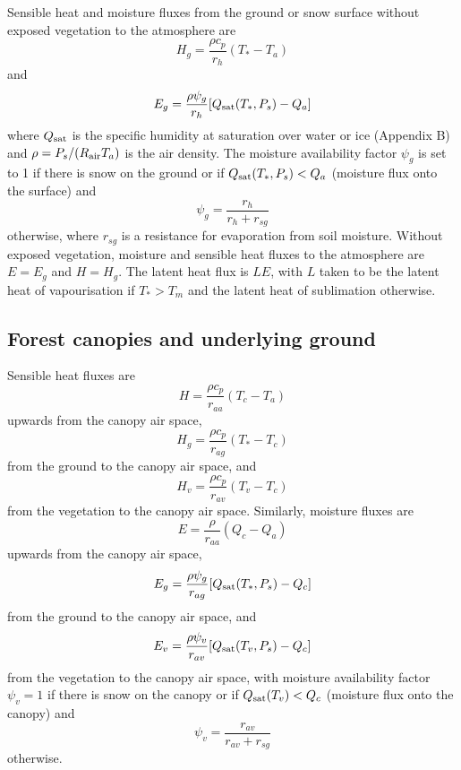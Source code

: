 \documentclass{article}
\begin{document}
Sensible heat and moisture fluxes from the ground or snow surface without exposed vegetation to the atmosphere are
\begin{equation}
H_g = \frac{\rho c_p}{r_h}(T_* - T_a)
\label{eq:Hg}
\end{equation}
and
\begin{equation}
E_g = \frac{\rho\psi_g}{r_h}[Q_{\rm sat}(T_*,P_s) - Q_a]
\label{eq:Eg}
\end{equation}
where $Q_{\rm sat}$ is the specific humidity at saturation over water or ice (Appendix B) and $\rho=P_s/(R_{\rm air}T_a)$ is the air density. The moisture availability factor $\psi_g$ is set to 1 if there is snow on the ground or if $Q_{\rm sat}(T_*,P_s)<Q_a$ (moisture flux onto the surface) and 
\begin{equation}
\psi_g = \frac{r_h}{r_h+r_{sg}}
\label{eq:psig}
\end{equation}
otherwise, where $r_{sg}$ is a resistance for evaporation from soil moisture. Without exposed vegetation, moisture and sensible heat fluxes to the atmosphere are $E=E_g$ and $H=H_g$. The latent heat flux is $LE$, with $L$ taken to be the latent heat of vapourisation if $T_*>T_m$ and the latent heat of sublimation otherwise.

\subsection{Forest canopies and underlying ground}

Sensible heat fluxes are 
\begin{equation}
H = \frac{\rho c_p}{r_{aa}}(T_c - T_a)
\label{eq:H}
\end{equation}
upwards from the canopy air space,
\begin{equation}
H_g = \frac{\rho c_p}{r_{ag}}(T_* - T_c)
\end{equation}
from the ground to the canopy air space, and
\begin{equation}
H_v = \frac{\rho c_p}{r_{av}}(T_v - T_c)
\label{eq:Hv}
\end{equation}
from the vegetation to the canopy air space. Similarly, moisture fluxes are  
\begin{equation}
E = \frac{\rho}{r_{aa}}(Q_c - Q_a)
\end{equation}
upwards from the canopy air space,
\begin{equation}
E_g = \frac{\rho \psi_g}{r_{ag}}[Q_{\rm sat}(T_*,P_s) - Q_c]
\end{equation}
from the ground to the canopy air space, and
\begin{equation}
E_v = \frac{\rho \psi_v}{r_{av}}[Q_{\rm sat}(T_v,P_s) - Q_c]
\label{eq:Ev}
\end{equation}
from the vegetation to the canopy air space, with moisture availability factor $\psi_v=1$ if there is snow on the canopy or if $Q_{\rm sat}(T_v)<Q_c$ (moisture flux onto the canopy) and
\begin{equation}
\psi_v = \frac{r_{av}}{r_{av}+r_{sg}}
\end{equation}
otherwise.
\end{document}
